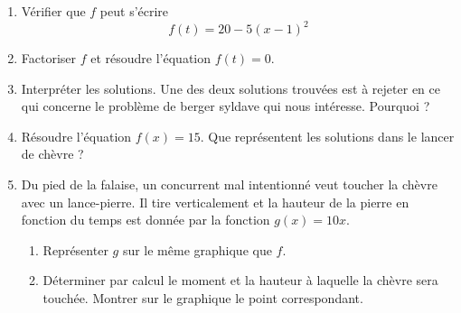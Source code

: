\begin{exercice}
    \begin{enumerate}
        \item
            Vérifier que \( f\) peut s'écrire
            \begin{equation}
                f(t)=20-5(x-1)^2
            \end{equation}
        \item
            Factoriser \( f\) et résoudre l'équation \( f(t)=0\).
        \item
            Interpréter les solutions. Une des deux solutions trouvées est à rejeter en ce qui concerne le problème de berger syldave qui nous intéresse. Pourquoi ?
        \item
            Résoudre l'équation \( f(x)=15\). Que représentent les solutions dans le lancer de chèvre ?
        \item
            Du pied de la falaise, un concurrent mal intentionné veut toucher la chèvre avec un lance-pierre. Il tire verticalement et la hauteur de la pierre en fonction du temps est donnée par la fonction \( g(x)=10x\).
            \begin{enumerate}
                \item
                    Représenter \( g\) sur le même graphique que $f$.
                \item
                    Déterminer par calcul le moment et la hauteur à laquelle la chèvre sera touchée. Montrer sur le graphique le point correspondant.
            \end{enumerate}
    \end{enumerate}

\end{exercice}
